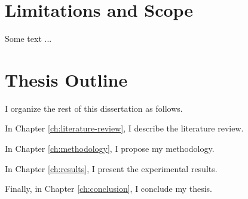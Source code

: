 



\section{Limitations and Scope}

Some text ...

\section{Thesis Outline}

I organize the rest of this dissertation as follows.

In Chapter \ref{ch:literature-review}, I describe the literature review.

In Chapter \ref{ch:methodology}, I propose my methodology.

In Chapter \ref{ch:results}, I present the experimental results.

Finally, in Chapter \ref{ch:conclusion}, I conclude my thesis.

\FloatBarrier
